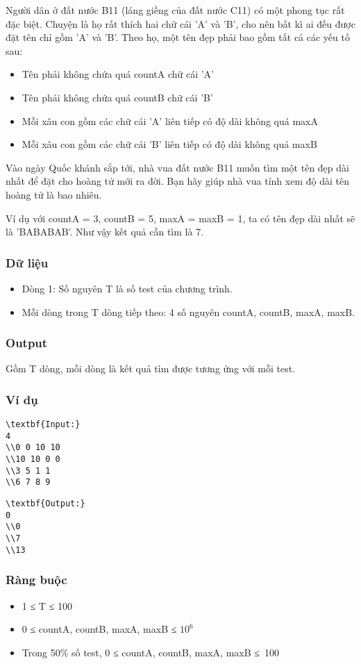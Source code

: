 



   Người dân ở đất nước B11 (láng giềng của đất nước C11) có một phong tục rất đặc biệt. Chuyện là họ rất thích hai chữ cái 'A' và 'B', cho nên bất kì ai đều được đặt tên chỉ gồm 'A' và 'B'. Theo họ, một tên đẹp phải bao gồm tất cả các yếu tố sau:  
\begin{itemize}
	\item     Tên phải không chứa quá countA chữ cái 'A'   
	\item     Tên phải không chứa quá countB chữ cái 'B'   
	\item     Mỗi xâu con gồm các chữ cái 'A' liên tiếp có độ dài không quá maxA   
	\item     Mỗi xâu con gồm các chữ cái 'B' liên tiếp có độ dài không quá maxB   
\end{itemize}

   Vào ngày Quốc khánh sắp tới, nhà vua đất nước B11 muốn tìm một tên đẹp dài nhất để đặt cho hoàng tử mới ra đời. Bạn hãy giúp nhà vua tính xem độ dài tên hoàng tử là bao nhiêu.  

   Ví dụ với countA = 3, countB = 5, maxA = maxB = 1, ta có tên đẹp dài nhất sẽ là 'BABABAB'. Như vậy kết quả cần tìm là 7.  

\subsubsection{   Dữ liệu  }
\begin{itemize}
	\item     Dòng 1: Số nguyên T là số test của chương trình.   
	\item     Mỗi dòng trong T dòng tiếp theo: 4 số nguyên countA, countB, maxA, maxB.   
\end{itemize}

\subsubsection{   Output  }

   Gồm T dòng, mỗi dòng là kết quả tìm được tương ứng với mỗi test.  

\subsubsection{   Ví dụ  }
\begin{verbatim}
\textbf{Input:}
4
\\0 0 10 10
\\10 10 0 0
\\3 5 1 1
\\6 7 8 9 \end{verbatim}
\begin{verbatim}
\textbf{Output:}
0
\\0
\\7
\\13 \end{verbatim}

\subsubsection{   Ràng buộc  }
\begin{itemize}
	\item     1 ≤ T ≤ 100   
	\item     0 ≤ countA, countB, maxA, maxB ≤ $10^{6}$
	\item     Trong 50\% số test, 0 ≤ countA, countB, maxA, maxB ≤ 100   
\end{itemize}
